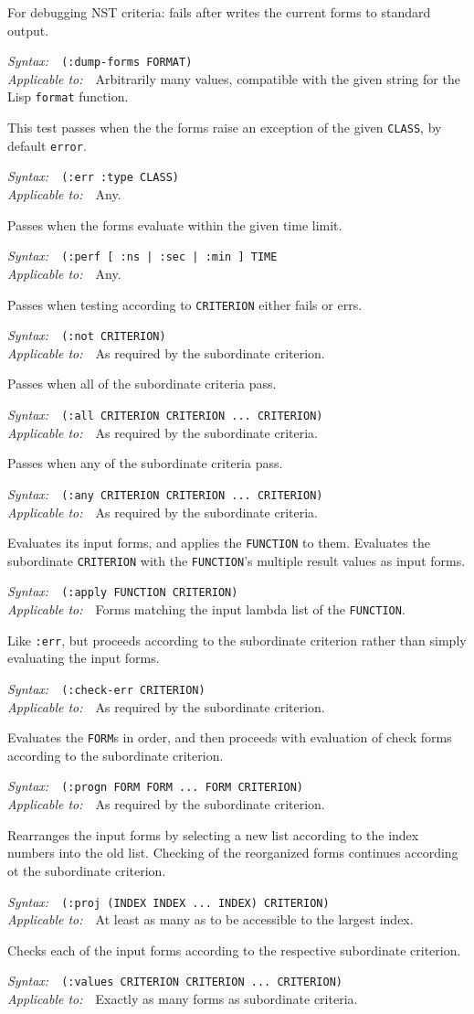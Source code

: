 \documentclass{article}
\newenvironment{criteria}%
{\begin{list}{}
    {\setlength{\labelwidth}{0pt}
     \setlength{\leftmargin}{2em}
     \setlength{\rightmargin}{1em}
     \setlength{\itemindent}{0em}}}%
  {\end{list}}
\def\criterion#1#2#3#4{\item[\bfseries #1] #4\par
  \emph{Syntax:}~~\texttt{#2}\\ \emph{Applicable to:}~~#3}
\begin{document}
\begin{criteria}
  \criterion{:dump-forms}{(:dump-forms FORMAT)} {Arbitrarily many
    values, compatible with the given string for the Lisp
    \texttt{format} function.}{For debugging NST criteria: fails after
    writes the current forms to standard output.}

  \criterion{:err}{(:err :type CLASS)}{Any.}{This test passes when the
    the forms raise an exception of the given \texttt{CLASS}, by
    default \texttt{error}.}

  \criterion{:perf}{(:perf [ :ns | :sec | :min ] TIME}{Any.}{Passes
    when the forms evaluate within the given time limit.}

  \criterion{:not}{(:not CRITERION)}{As required by the subordinate
    criterion.}{Passes when testing according to \texttt{CRITERION}
    either fails or errs.}

  \criterion{:all}{(:all CRITERION CRITERION ...\ CRITERION)}{As
    required by the subordinate criteria.}{Passes when all of the
    subordinate criteria pass.}

  \criterion{:any}{(:any CRITERION CRITERION ...\ CRITERION)}{As
    required by the subordinate criteria.}{Passes when any of the
    subordinate criteria pass.}

  \criterion{:apply}{(:apply FUNCTION CRITERION)}{Forms matching the
    input lambda list of the \texttt{FUNCTION}.}{Evaluates its input
    forms, and applies the \texttt{FUNCTION} to them.  Evaluates the
    subordinate \texttt{CRITERION} with the \texttt{FUNCTION}'s
    multiple result values as input forms.}

  \criterion{:check-err}{(:check-err CRITERION)}{As required by the
    subordinate criterion.}{Like \texttt{:err}, but proceeds according
    to the subordinate criterion rather than simply evaluating the
    input forms.}

  \criterion{:progn}{(:progn FORM FORM ...\ FORM CRITERION)}{As
    required by the subordinate criterion.}{Evaluates the
    \texttt{FORM}s in order, and then proceeds with evaluation of
    check forms according to the subordinate criterion.}

  \criterion{:proj}{(:proj (INDEX INDEX ...\ INDEX) CRITERION)}{At
    least as many as to be accessible to the largest
    index.}{Rearranges the input forms by selecting a new list
    according to the index numbers into the old list.  Checking of the
    reorganized forms continues according ot the subordinate
    criterion.}

  \criterion{:values}{(:values CRITERION CRITERION ...\
    CRITERION)}{Exactly as many forms as subordinate criteria.}{Checks
    each of the input forms according to the respective subordinate
    criterion.}


\end{criteria}
\end{document}
